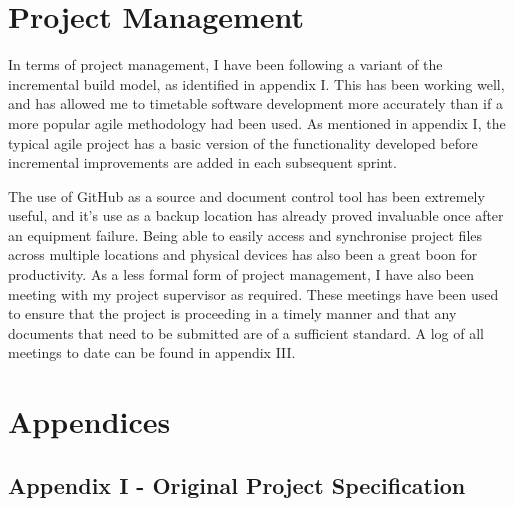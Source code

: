 \documentclass[10pt,a4paper]{report}
\begin{document}
\section*{Project Management}
In terms of project management, I have been following a variant of the incremental build model, as identified in appendix I. This has been working well, and has allowed me to timetable software development more accurately than if a more popular agile methodology had been used. As mentioned in appendix I, the typical agile project has a basic version of the functionality developed before incremental improvements are added in each subsequent sprint. 

The use of GitHub as a source and document control tool has been extremely useful, and it's use as a backup location has already proved invaluable once after an equipment failure. Being able to easily access and synchronise project files across multiple locations and physical devices has also been a great boon for productivity. As a less formal form of project management, I have also been meeting with my project supervisor as required. These meetings have been used to ensure that the project is proceeding in a timely manner and that any documents that need to be submitted are of a sufficient standard. A log of all meetings to date can be found in appendix III.

\section*{Appendices}

\subsection*{Appendix I - Original Project Specification}

\end{document}
